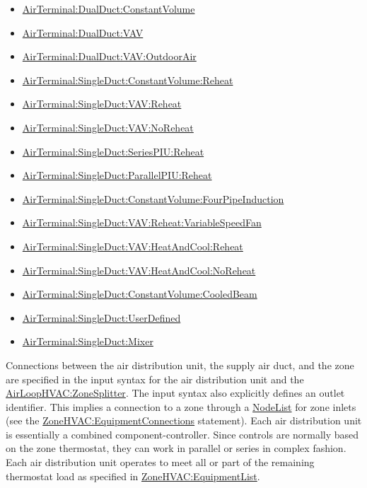 \begin{itemize}
\item
  \hyperref[airterminaldualductconstantvolume]{AirTerminal:DualDuct:ConstantVolume}
\item
  \hyperref[airterminaldualductvav]{AirTerminal:DualDuct:VAV}
\item
  \hyperref[airterminaldualductvavoutdoorair]{AirTerminal:DualDuct:VAV:OutdoorAir}
\item
  \hyperref[airterminalsingleductconstantvolumereheat]{AirTerminal:SingleDuct:ConstantVolume:Reheat}
\item
  \hyperref[airterminalsingleductvavreheat]{AirTerminal:SingleDuct:VAV:Reheat}
\item
  \hyperref[airterminalsingleductvavnoreheat]{AirTerminal:SingleDuct:VAV:NoReheat}
\item
  \hyperref[airterminalsingleductseriespiureheat]{AirTerminal:SingleDuct:SeriesPIU:Reheat}
\item
  \hyperref[airterminalsingleductparallelpiureheat]{AirTerminal:SingleDuct:ParallelPIU:Reheat}
\item
  \hyperref[airterminalsingleductconstantvolumefourpipeinduction]{AirTerminal:SingleDuct:ConstantVolume:FourPipeInduction}
\item
  \hyperref[airterminalsingleductvavreheatvariablespeedfan]{AirTerminal:SingleDuct:VAV:Reheat:VariableSpeedFan}
\item
  \hyperref[airterminalsingleductvavheatandcoolreheat]{AirTerminal:SingleDuct:VAV:HeatAndCool:Reheat}
\item
  \hyperref[airterminalsingleductvavheatandcoolnoreheat]{AirTerminal:SingleDuct:VAV:HeatAndCool:NoReheat}
\item
  \hyperref[airterminalsingleductconstantvolumecooledbeam]{AirTerminal:SingleDuct:ConstantVolume:CooledBeam}
\item
  \hyperref[airterminalsingleductuserdefined]{AirTerminal:SingleDuct:UserDefined}
\item
  \hyperref[airterminalsingleductmixer]{AirTerminal:SingleDuct:Mixer}

\end{itemize}

Connections between the air distribution unit, the supply air duct, and the zone are specified in the input syntax for the air distribution unit and the \hyperref[airloophvaczonesplitter]{AirLoopHVAC:ZoneSplitter}. The input syntax also explicitly defines an outlet identifier. This implies a connection to a zone through a \hyperref[nodelist]{NodeList} for zone inlets (see the \hyperref[zonehvacequipmentconnections]{ZoneHVAC:EquipmentConnections} statement). Each air distribution unit is essentially a combined component-controller. Since controls are normally based on the zone thermostat, they can work in parallel or series in complex fashion. Each air distribution unit operates to meet all or part of the remaining thermostat load as specified in \hyperref[zonehvacequipmentlist]{ZoneHVAC:EquipmentList}.

